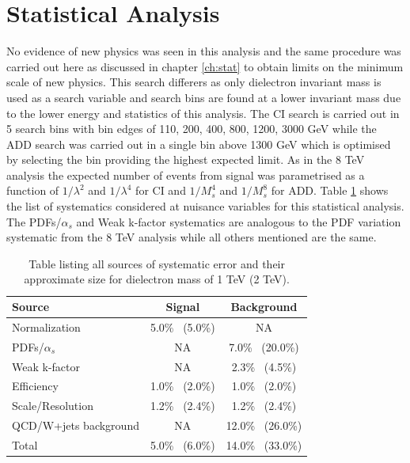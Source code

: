 \section{Statistical Analysis}

	No evidence of new physics was seen in this analysis and the same procedure was carried out here as discussed in chapter \ref{ch:stat} to obtain limits on the minimum scale of new physics. This search differers as only dielectron invariant mass is used as a search variable and search bins are found at a lower invariant mass due to the lower energy and statistics of this analysis. The CI search is carried out in 5 search bins with bin edges of {110, 200, 400, 800, 1200, 3000} GeV while the ADD search was carried out in a single bin above 1300 GeV which is optimised by selecting the bin providing the highest expected limit. As in the 8 TeV analysis the expected number of events from signal was parametrised as a function of $1/\lambda^{2}$ and $1/\lambda^{4}$ for CI and $1/M_{s}^{4}$ and $1/M_{s}^{8}$ for ADD. Table \ref{tab:sys7} shows the list of systematics considered at nuisance variables for this statistical analysis. The PDFs/$\alpha_{s}$ and Weak k-factor systematics are analogous to the PDF variation systematic from the 8 TeV analysis while all others mentioned are the same. 


	\begin {table}[h]
        \begin{center}
        \begin{tabular}{ | l | c c | } 
            \hline
            Source 					& Signal            & Background         		\\
            \hline
            Normalization       	& 5.0\% ~(5.0\%)      	& NA        			\\
			PDFs/$\alpha_{s}$		& NA 			      	& 7.0\% ~(20.0\%)      	\\
			Weak k-factor       	& NA 			      	& 2.3\% ~(4.5\%)       	\\
			Efficiency  	     	& 1.0\% ~(2.0\%)      	& 1.0\% ~(2.0\%)       	\\
			Scale/Resolution       	& 1.2\% ~(2.4\%)      	& 1.2\% ~(2.4\%)       	\\
			QCD/W+jets background  	& NA 			      	& 12.0\% ~(26.0\%)      \\
            \hline  
            Total               	& 5.0\% ~(6.0\%)      	& 14.0\% ~(33.0\%)      \\
            \hline
        \end{tabular}
        \caption{Table listing all sources of systematic error and their approximate size for dielectron mass of 1 TeV (2 TeV).}
        \label{tab:sys7}
        \end{center}
    \end {table}



